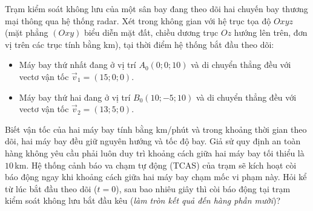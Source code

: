 \begin{ex}%
	Trạm kiểm soát không lưu của một sân bay đang theo dõi hai chuyến bay thương mại thông qua hệ thống radar. Xét trong không gian  với hệ trục tọa độ $Oxyz$ (mặt phẳng $(Oxy)$ biểu diễn mặt đất, chiều dương trục $Oz$ hướng lên trên, đơn vị trên các trục tính bằng km), tại thời điểm hệ thống bắt đầu theo dõi:
	\begin{itemize} 
		\item Máy bay thứ nhất đang ở vị trí $A_0(0;0;10)$ và di chuyển thẳng đều với vectơ vận tốc \break $\vec{v}_{1} = (15;0;0)$.
		\item Máy bay thứ hai đang ở vị trí $B_0(10;-5;10)$ và di chuyển thẳng đều với vectơ vận tốc \break $\vec{v}_{2} = (13;5;0)$.
	\end{itemize}
	Biết vận tốc của hai máy bay tính bằng km/phút và trong khoảng thời gian theo dõi, hai máy bay đều giữ nguyên hướng và tốc độ bay. Giả sử quy định an toàn hàng không yêu cầu phải luôn duy trì khoảng cách giữa hai máy bay tối thiểu là $10$\,km. Hệ thống cảnh báo va chạm tự động (TCAS) của trạm sẽ kích hoạt còi báo động ngay khi khoảng cách giữa hai máy bay chạm mốc vi phạm này. Hỏi kể từ lúc bắt đầu theo dõi ($t = 0$), sau bao nhiêu giây thì còi báo động tại trạm kiểm soát không lưu bắt đầu kêu ({\it làm tròn kết quả đến hàng phần mười})?
	\par
\end{ex}

